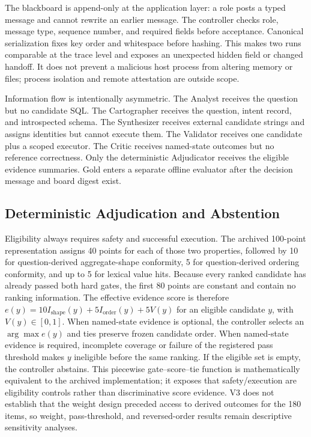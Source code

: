\documentclass[applsci,article,submit,moreauthors]{Definitions/mdpi}
\begin{document}
The blackboard is append-only at the application layer: a role posts a typed message and cannot rewrite an earlier message. The controller checks role, message type, sequence number, and required fields before acceptance. Canonical serialization fixes key order and whitespace before hashing. This makes two runs comparable at the trace level and exposes an unexpected hidden field or changed handoff. It does not prevent a malicious host process from altering memory or files; process isolation and remote attestation are outside scope.

Information flow is intentionally asymmetric. The Analyst receives the question but no candidate SQL. The Cartographer receives the question, intent record, and introspected schema. The Synthesizer receives external candidate strings and assigns identities but cannot execute them. The Validator receives one candidate plus a scoped executor. The Critic receives named-state outcomes but no reference correctness. Only the deterministic Adjudicator receives the eligible evidence summaries. Gold enters a separate offline evaluator after the decision message and board digest exist.

\subsection{Deterministic Adjudication and Abstention}

Eligibility always requires safety and successful execution. The archived 100-point representation assigns 40 points for each of those two properties, followed by 10 for question-derived aggregate-shape conformity, 5 for question-derived ordering conformity, and up to 5 for lexical value hits. Because every ranked candidate has already passed both hard gates, the first 80 points are constant and contain no ranking information. The effective evidence score is therefore $e(y)=10I_{\mathrm{shape}}(y)+5I_{\mathrm{order}}(y)+5V(y)$ for an eligible candidate $y$, with $V(y)\in[0,1]$. When named-state evidence is optional, the controller selects an $\arg\max e(y)$ and ties preserve frozen candidate order. When named-state evidence is required, incomplete coverage or failure of the registered pass threshold makes $y$ ineligible before the same ranking. If the eligible set is empty, the controller abstains. This piecewise gate--score--tie function is mathematically equivalent to the archived implementation; it exposes that safety/execution are eligibility controls rather than discriminative score evidence. V3 does not establish that the weight design preceded access to derived outcomes for the 180 items, so weight, pass-threshold, and reversed-order results remain descriptive sensitivity analyses.
\end{document}
